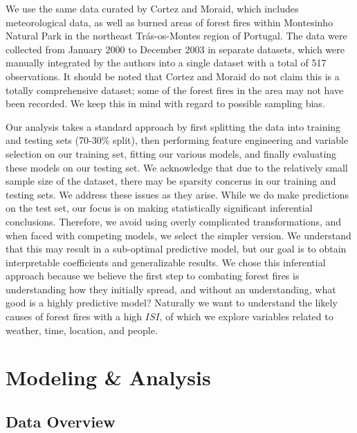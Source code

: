 \documentclass{article}
\begin{document}
We use the same data curated by Cortez and Moraid, which includes meteorological data, as well as burned areas of forest fires within Montesinho Natural Park in the northeast Tr\'as-os-Montes region of Portugal. The data were collected from January 2000 to December 2003 in separate datasets, which were manually integrated by the authors into a single dataset with a total of 517 observations. It should be noted that Cortez and Moraid do not claim this is a totally comprehensive dataset; some of the forest fires in the area may not have been recorded. We keep this in mind with regard to possible sampling bias.

Our analysis takes a standard approach by first splitting the data into training and testing sets (70-30\% split), then performing feature engineering and variable selection on our training set, fitting our various models, and finally evaluating these models on our testing set. We acknowledge that due to the relatively small sample size of the dataset, there may be sparsity concerns in our training and testing sets. We address these issues as they arise. While we do make predictions on the test set, our focus is on making statistically significant inferential conclusions. Therefore, we avoid using overly complicated transformations, and when faced with competing models, we select the simpler version. We understand that this may result in a sub-optimal predictive model, but our goal is to obtain interpretable coefficients and generalizable results. We chose this inferential approach because we believe the first step to combating forest fires is understanding how they initially spread, and without an understanding, what good is a highly predictive model? Naturally we want to understand the likely causes of forest fires with a high $\textit{ISI}$, of which we explore variables related to weather, time, location, and people.

\section{Modeling \& Analysis}\label{Analysis}

\subsection{Data Overview}\label{data_over}
\end{document}
